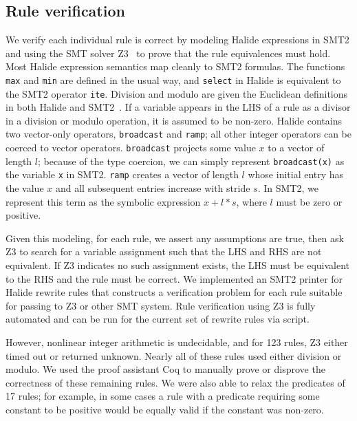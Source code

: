 \documentclass[sigplan,10pt,review,anonymous]{acmart}\settopmatter{printfolios=true,printccs=false,printacmref=false}
\newcommand{\NumPredicatesRelaxed}{{\color{red} 17}\xspace}
\begin{document}
\subsection{Rule verification}

We verify each individual rule is correct by modeling Halide expressions in SMT2
and using the SMT solver Z3~\cite{de2008z3} to prove that the rule equivalences must hold.
Most Halide expression semantics map cleanly
to SMT2 formulas. The functions \texttt{max} and \texttt{min} are defined in
the usual way, and \texttt{select} in Halide is equivalent to the SMT2 operator
\texttt{ite}. Division and modulo are given the Euclidean definitions in both
Halide and SMT2~\cite{boute1992euclidean}. If a variable appears in the LHS of a rule as a divisor in a
division or modulo operation, it is assumed to be non-zero. %
Halide contains two vector-only operators, \texttt{broadcast} and \texttt{ramp}; all
other integer operators can be coerced to vector operators. 
\texttt{broadcast} projects some value $x$ to a vector of length $l$; because of
the type coercion, we can simply represent \texttt{broadcast(x)} as the variable
\texttt{x} in SMT2. \texttt{ramp} creates a vector of length $l$
whose initial entry has the value $x$ and all subsequent entries increase with
stride $s$. In SMT2, we represent this term as the symbolic expression $x + l *
s$, where $l$ must be zero or positive.

Given this modeling, for each rule, we assert any assumptions are true, then
ask Z3 to search for a variable assignment such that the LHS and RHS are not
equivalent.  If Z3 indicates no such assignment exists, the LHS must be equivalent to
the RHS and the rule must be correct. We implemented an SMT2 printer for 
Halide rewrite rules that constructs a verification problem for each rule
suitable for passing to Z3 or other SMT system.  Rule verification using Z3 is fully automated
and can be run for the current set of rewrite rules via script.

However, nonlinear integer arithmetic is undecidable, and for 123
rules, Z3 either timed out or returned unknown. Nearly all of these rules used
either division or modulo. We used the proof assistant Coq to manually prove or
disprove the correctness of these remaining rules. We
were also able to relax the predicates of \NumPredicatesRelaxed rules; for example, in some cases a rule
with a predicate requiring some constant to be positive would be equally valid
if the constant was non-zero.
\end{document}
